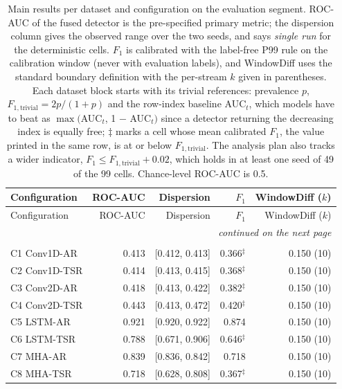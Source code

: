 \begin{longtable}{@{}lrrrr@{}}
\caption{Main results per dataset and configuration on the evaluation segment. ROC-AUC of the fused detector is the pre-specified primary metric; the dispersion column gives the observed range over the two seeds, and says \emph{single run} for the deterministic cells. $F_1$ is calibrated with the label-free P99 rule on the calibration window (never with evaluation labels), and WindowDiff uses the standard boundary definition with the per-stream $k$ given in parentheses. Each dataset block starts with its trivial references: prevalence $p$, $F_{1,\mathrm{trivial}}=2p/(1+p)$ and the row-index baseline AUC$_t$, which models have to beat as $\max($AUC$_t$, 1 $-$ AUC$_t)$ since a detector returning the decreasing index is equally free; $\ddagger$ marks a cell whose mean calibrated $F_1$, the value printed in the same row, is at or below $F_{1,\mathrm{trivial}}$. The analysis plan also tracks a wider indicator, $F_1 \leq F_{1,\mathrm{trivial}} + 0.02$, which holds in at least one seed of 49 of the 99 cells. Chance-level ROC-AUC is 0.5.}\label{tab:main-results}\\
\toprule
Configuration & ROC-AUC & Dispersion & $F_1$ & WindowDiff ($k$) \\
\midrule
\endfirsthead
\toprule
Configuration & ROC-AUC & Dispersion & $F_1$ & WindowDiff ($k$) \\
\midrule
\endhead
\midrule \multicolumn{5}{r}{\textit{continued on the next page}} \\
\endfoot
\bottomrule
\endlastfoot
\multicolumn{5}{l}{\textit{KNAD Active Wiretap} --- $n=2$ seed(s); prevalence $p=0.493$; $F_{1,\mathrm{trivial}}=0.661$; AUC$_t=0.970$} \\
\quad C1 Conv1D-AR & 0.413 & [0.412, 0.413] & 0.366$^{\ddagger}$ & 0.150 (10) \\
\quad C2 Conv1D-TSR & 0.414 & [0.413, 0.415] & 0.368$^{\ddagger}$ & 0.150 (10) \\
\quad C3 Conv2D-AR & 0.418 & [0.413, 0.422] & 0.382$^{\ddagger}$ & 0.150 (10) \\
\quad C4 Conv2D-TSR & 0.443 & [0.413, 0.472] & 0.420$^{\ddagger}$ & 0.150 (10) \\
\quad C5 LSTM-AR & 0.921 & [0.920, 0.922] & 0.874 & 0.150 (10) \\
\quad C6 LSTM-TSR & 0.788 & [0.671, 0.906] & 0.646$^{\ddagger}$ & 0.150 (10) \\
\quad C7 MHA-AR & 0.839 & [0.836, 0.842] & 0.718 & 0.150 (10) \\
\quad C8 MHA-TSR & 0.718 & [0.628, 0.808] & 0.367$^{\ddagger}$ & 0.150 (10) \\

\end{longtable}
